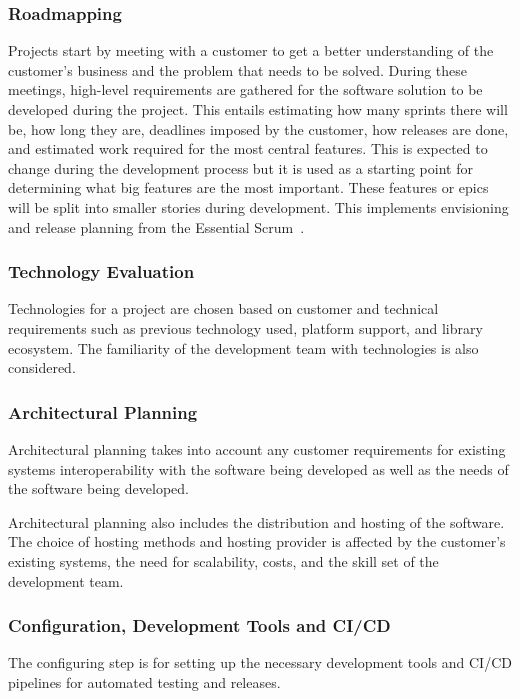 \subsubsection{Roadmapping}
Projects start by meeting with a customer to get a better understanding of the customer's business and the problem that needs to be solved. During these meetings, high-level requirements are gathered for the software solution to be developed during the project. This entails estimating how many sprints there will be, how long they are, deadlines imposed by the customer, how releases are done, and estimated work required for the most central features. This is expected to change during the development process but it is used as a starting point for determining what big features are the most important. These features or epics will be split into smaller stories during development. This implements envisioning and release planning from the Essential Scrum~\cite{essentialscrum}.

\subsubsection{Technology Evaluation}
Technologies for a project are chosen based on customer and technical requirements such as previous technology used, platform support, and library ecosystem. The familiarity of the development team with technologies is also considered.

\subsubsection{Architectural Planning}
Architectural planning takes into account any customer requirements for existing systems interoperability with the software being developed as well as the needs of the software being developed.

Architectural planning also includes the distribution and hosting of the software. The choice of hosting methods and hosting provider is affected by the customer's existing systems, the need for scalability, costs, and the skill set of the development team.

\subsubsection{Configuration, Development Tools and CI/CD}
The configuring step is for setting up the necessary development tools and CI/CD pipelines for automated testing and releases.

